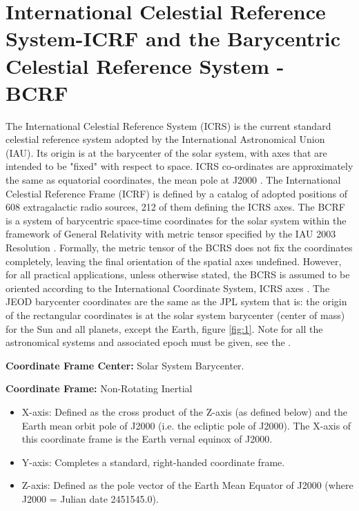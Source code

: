 \nopagebreak
\section{International Celestial Reference System-ICRF and the Barycentric Celestial Reference System - BCRF} \label{sec:bcrf} 

The International Celestial Reference System (ICRS) is the current standard celestial reference system adopted by the International Astronomical Union (IAU). Its origin is at the barycenter of the solar system, with axes that are intended to be "fixed" with respect to space. ICRS co-ordinates are approximately the same as equatorial coordinates, the mean pole at J2000 \cite{IERS2003}. The International Celestial Reference Frame (ICRF) is defined by a catalog of adopted positions of 608 extragalactic radio sources, 212 of them defining the ICRS axes. The BCRF is a system of barycentric space-time coordinates for the solar system within the framework of General Relativity with metric tensor specified by the IAU 2003 Resolution \cite{IERS2003}. Formally, the metric tensor of the BCRS does not fix the coordinates completely, leaving the final orientation of the spatial axes undefined. However, for all practical applications, unless otherwise stated, the BCRS is assumed to be oriented according to the International Coordinate System, ICRS axes \cite{IERS2003}. The JEOD barycenter coordinates are the same as the JPL system that is: the origin of the rectangular coordinates is at the solar system barycenter (center of mass) for the Sun and all planets, except the Earth, figure \ref{fig:1}. Note for all the astronomical systems and associated epoch must be given, see the . 

\textbf{Coordinate Frame Center: }Solar System Barycenter. 

\textbf{Coordinate Frame: } Non-Rotating Inertial

\begin{itemize}
\item X-axis: Defined as the cross product of the Z-axis (as defined below) and the Earth mean orbit pole of J2000 (i.e. the ecliptic pole of J2000). The X-axis of this coordinate frame is the Earth vernal equinox of J2000.
\item Y-axis: Completes a standard, right-handed coordinate frame.
\item Z-axis: Defined as the pole vector of the Earth Mean Equator of J2000 (where J2000 = Julian date 2451545.0).
\end{itemize}

